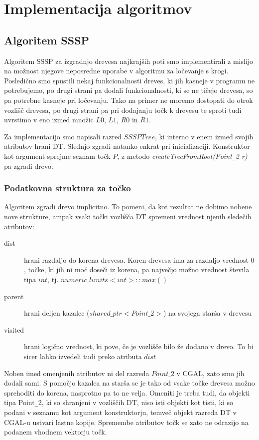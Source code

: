 \documentclass[a4paper, 12pt]{book}
\newcommand{\U}{\texttt{\_}}
\begin{document}
\chapter{Implementacija algoritmov}
\label{ch3}


\section{Algoritem SSSP}

Algoritem SSSP za izgradnjo drevesa najkrajših poti smo implementirali z mislijo na možnost njegove neposredne uporabe v algoritmu za ločevanje s krogi. Posledično smo spustili nekaj funkcionalnosti dreves, ki jih kasneje v programu ne potrebujemo, po drugi strani pa dodali funkcionalnosti, ki se ne tičejo drevesa, so pa potrebne kasneje pri ločevanju. Tako na primer ne moremo dostopati do otrok vozlišč drevesa, po drugi strani pa pri dodajanju točk k drevesu te sproti tudi uvrstimo v eno izmed množic $L0$, $L1$, $R0$ in $R1$.

Za implementacijo smo napisali razred $SSSPTree$, ki interno v enem izmed svojih atributov hrani DT. Slednjo zgradi natanko enkrat pri inicializaciji. Konstruktor kot argument sprejme seznam točk $P$, z metodo \textit{createTreeFromRoot(Point\U 2 r)} pa zgradi drevo.

\subsection{Podatkovna struktura za točko}
\label{point-refs}
Algoritem zgradi drevo implicitno. To pomeni, da kot rezultat ne dobimo nobene nove strukture, ampak vsaki točki vozlišča DT spremeni vrednost njenih sledečih atributov:

\begin{description}
\item[dist] hrani razdaljo do korena drevesa. Koren drevesa ima za razdaljo vrednost $0$, točke, ki jih ni moč doseči iz korena, pa največjo možno vrednost števila tipa $int$, tj. $numeric\U limits<int>::max()$
\item[parent] hrani deljen kazalec ($shared\U ptr<Point\U 2>$) na svojega starša v drevesu
\item[visited] hrani logično vrednost, ki pove, če je vozlišče bilo že dodano v drevo. To bi sicer lahko izvedeli tudi preko atributa $dist$
\end{description}

Noben imed omenjenih atributov ni del razreda $Point\U 2$ v CGAL, zato smo jih dodali sami. S pomočjo kazalca na starša se je tako od vsake točke drevesa možno sprehoditi do korena, nasprotno pa to ne velja. Omeniti je treba tudi, da objekti tipa Point\U 2, ki so shranjeni v vozliščih DT, niso isti objekti kot tisti, ki so podani v seznamu kot argument konstruktorju, temveč objekt razreda DT v CGAL-u ustvari lastne kopije. Spremembe atributov točk se zato ne odrazijo na podanem vhodnem vektorju točk. 
\end{document}

